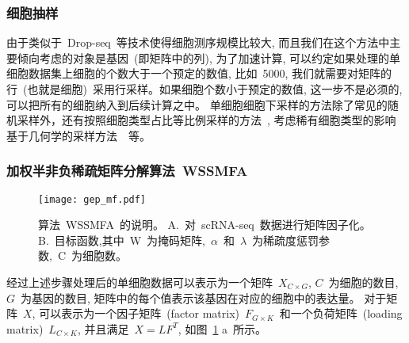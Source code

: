 \subsubsection{细胞抽样}
由于类似于~Drop-seq~等技术使得细胞测序规模比较大, 而且我们在这个方法中主要倾向考虑的对象是基因~(即矩阵中的列), 
为了加速计算, 可以约定如果处理的单细胞数据集上细胞的个数大于一个预定的数值, 比如~5000,
我们就需要对矩阵的行~(也就是细胞)~采用行采样。如果细胞个数小于预定的数值, 这一步不是必须的, 可以把所有的细胞纳入到后续计算之中。
单细胞细胞下采样的方法除了常见的随机采样外，还有按照细胞类型占比等比例采样的方法~\cite{sinha2018dropclust},
考虑稀有细胞类型的影响基于几何学的采样方法~\cite{hie2019geometric}~等。

\subsubsection{加权半非负稀疏矩阵分解算法~WSSMFA}

\begin{figure}[!htbp]
    \centering
    \texttt{[image: gep\_mf.pdf]}
    \caption{
        算法~WSSMFA~的说明。
        A.~对~scRNA-seq~数据进行矩阵因子化。
        B.~目标函数,其中~W~为掩码矩阵,~$\alpha$~和~$\lambda$~为稀疏度惩罚参数,~C~为细胞数。
    }
    \label{fig:gep-mf}
\end{figure}

经过上述步骤处理后的单细胞数据可以表示为一个矩阵~$X_{C \times G}$, $C$~为细胞的数目, $G$~为基因的数目, 
矩阵中的每个值表示该基因在对应的细胞中的表达量。
对于矩阵~$X$, 可以表示为一个因子矩阵~(factor matrix)~$F_{G \times K}$~和一个负荷矩阵~(loading matrix)~$L_{C \times K}$,
并且满足~$X=LF^T$, 如图~\ref{fig:gep-mf} a~所示。 

